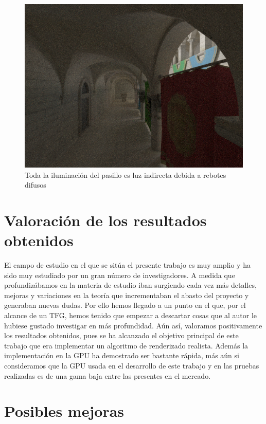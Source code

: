 \clearpage

\begin{figure}
\centering
\includegraphics[width=5in]{indirect.png}
\caption{Toda la iluminación del pasillo es luz indirecta debida a rebotes difusos}
\end{figure}

\clearpage

\section{Valoración de los resultados obtenidos}


El campo de estudio en el que se sitúa el presente trabajo es muy amplio y ha sido muy estudiado por un gran número de investigadores. A medida que profundizábamos en la materia de estudio iban surgiendo cada vez más detalles, mejoras y variaciones en la teoría que incrementaban el abasto del proyecto y generaban nuevas dudas. Por ello hemos llegado a un punto en el que, por el alcance de un TFG, hemos tenido que empezar a descartar cosas que al autor le hubiese gustado investigar en más profundidad. Aún así, valoramos positivamente los resultados obtenidos, pues se ha alcanzado el objetivo principal de este trabajo que era implementar un algoritmo de renderizado realista. Además la implementación en la GPU ha demostrado ser bastante rápida, más aún si consideramos que la GPU usada en el desarrollo de este trabajo y en las pruebas realizadas es de una gama baja entre las presentes en el mercado.

\clearpage

\section{Posibles mejoras}

